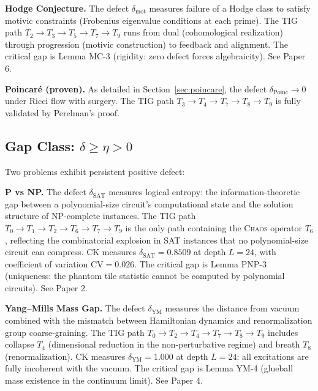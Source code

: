 \documentclass[11pt]{article}
\begin{document}
\medskip
\noindent
\textbf{Hodge Conjecture.}  The defect $\delta_{\mathrm{mot}}$
measures failure of a Hodge class to satisfy motivic constraints
(Frobenius eigenvalue conditions at each prime).  The TIG path
$T_2 \to T_3 \to T_5 \to T_7 \to T_9$ runs from dual (cohomological
realization) through progression (motivic construction) to feedback
and alignment.  The critical gap is Lemma MC-3 (rigidity: zero defect
forces algebraicity).  See Paper 6.

\medskip
\noindent
\textbf{Poincar\'e (proven).}  As detailed in
Section~\ref{sec:poincare}, the defect $\delta_{\mathrm{Poinc}} \to 0$
under Ricci flow with surgery.  The TIG path
$T_3 \to T_4 \to T_7 \to T_8 \to T_9$ is fully validated by
Perelman's proof.

\subsection{Gap Class: $\delta \geq \eta > 0$}
\label{subsec:gap}

Two problems exhibit persistent positive defect:

\medskip
\noindent
\textbf{P vs NP.}  The defect $\delta_{\mathrm{SAT}}$ measures logical
entropy: the information-theoretic gap between a polynomial-size
circuit's computational state and the solution structure of NP-complete
instances.  The TIG path $T_0 \to T_1 \to T_2 \to T_6 \to T_7 \to T_9$
is the only path containing the \textsc{Chaos} operator $T_6$, reflecting
the combinatorial explosion in SAT instances that no polynomial-size
circuit can compress.  CK measures $\delta_{\mathrm{SAT}} = 0.8509$ at
depth $L = 24$, with coefficient of variation $\mathrm{CV} = 0.026$.
The critical gap is Lemma PNP-3 (uniqueness: the phantom tile statistic
cannot be computed by polynomial circuits).  See Paper 2.

\medskip
\noindent
\textbf{Yang--Mills Mass Gap.}  The defect $\delta_{\mathrm{YM}}$
measures the distance from vacuum combined with the mismatch between
Hamiltonian dynamics and renormalization group coarse-graining.  The
TIG path $T_0 \to T_2 \to T_4 \to T_7 \to T_8 \to T_9$ includes
collapse $T_4$ (dimensional reduction in the non-perturbative regime)
and breath $T_8$ (renormalization).  CK measures
$\delta_{\mathrm{YM}} = 1.000$ at depth $L = 24$: all excitations are
fully incoherent with the vacuum.  The critical gap is Lemma YM-4
(glueball mass existence in the continuum limit).  See Paper 4.
\end{document}
